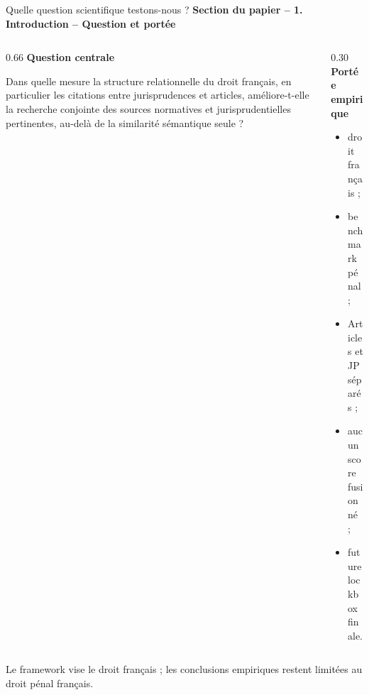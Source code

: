 \documentclass[aspectratio=169,10pt]{beamer}
\newcommand{\keybox}[1]{%
  \begin{center}
  \colorbox{accentsoft}{\parbox{0.92\linewidth}{\centering #1}}
  \end{center}}
\newcommand{\papersection}[1]{%
  {\scriptsize\textcolor{accent}{\textbf{Section du papier -- #1}}}\par\vspace{0.55em}}
\begin{document}
\begin{frame}{Quelle question scientifique testons-nous ?}
  \papersection{1. Introduction -- Question et portée}
  \footnotesize
  \begin{columns}[T,onlytextwidth]
    \begin{column}{0.66\textwidth}
      \textbf{\color{accent}Question centrale}

      \vspace{0.45em}
      \large
      Dans quelle mesure la structure relationnelle du droit français,
      en particulier les citations entre jurisprudences et articles,
      améliore-t-elle la recherche conjointe des sources normatives et
      jurisprudentielles pertinentes, au-delà de la similarité sémantique seule ?
    \end{column}
    \begin{column}{0.30\textwidth}
      \textbf{Portée empirique}
      \begin{itemize}\setlength{\itemsep}{0.3em}
        \item droit français ;
        \item benchmark pénal ;
        \item Articles et JP séparés ;
        \item aucun score fusionné ;
        \item future lockbox finale.
      \end{itemize}
    \end{column}
  \end{columns}

  \vspace{0.7em}
  \keybox{\scriptsize Le framework vise le droit français ; les conclusions empiriques
  restent limitées au droit pénal français.}
\end{frame}
\end{document}
